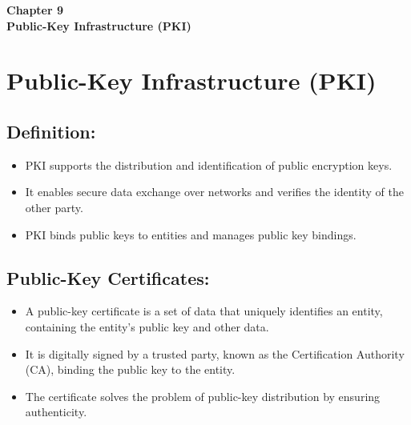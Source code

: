 \clearpage
\thispagestyle{empty} 
\renewcommand{\footrulewidth}{0pt}
\begin{center}
    \vspace*{\fill} 
    \Huge \textbf{Chapter 9} \\
    \Huge \textbf{Public-Key Infrastructure (PKI)}
    \vspace*{\fill}
\end{center}
\clearpage
\fancyfoot[]{}
\chapter{Public-Key Infrastructure (PKI)}

\section{Definition:}
\begin{itemize}
    \item PKI supports the distribution and identification of public encryption keys.
    \item It enables secure data exchange over networks and verifies the identity of the other party.
    \item PKI binds public keys to entities and manages public key bindings.
\end{itemize}

\section{Public-Key Certificates:}
\begin{itemize}
    \item A public-key certificate is a set of data that uniquely identifies an entity, containing the entity’s public key and other data.
    \item It is digitally signed by a trusted party, known as the Certification Authority (CA), binding the public key to the entity.
    \item The certificate solves the problem of public-key distribution by ensuring authenticity.
\end{itemize}

